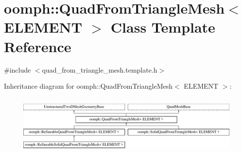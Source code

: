 \hypertarget{classoomph_1_1QuadFromTriangleMesh}{}\section{oomph\+:\+:Quad\+From\+Triangle\+Mesh$<$ E\+L\+E\+M\+E\+NT $>$ Class Template Reference}
\label{classoomph_1_1QuadFromTriangleMesh}


{\ttfamily \#include $<$quad\+\_\+from\+\_\+triangle\+\_\+mesh.\+template.\+h$>$}

Inheritance diagram for oomph\+:\+:Quad\+From\+Triangle\+Mesh$<$ E\+L\+E\+M\+E\+NT $>$\+:\begin{figure}[H]
\begin{center}
\leavevmode
\includegraphics[height=3.027027cm]{classoomph_1_1QuadFromTriangleMesh}
\end{center}
\end{figure}
